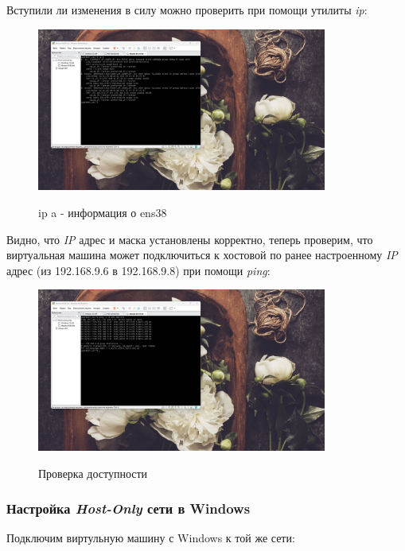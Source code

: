 \documentclass[a4paper]{article}
\begin{document}
  Вступили ли изменения в силу можно проверить при помощи утилиты \textit{ip}:

  \begin{figure}[H]
    \centering
    \includegraphics[width=0.85\textwidth]{06_00 (55)}
    \label{img:55}
    \caption{ip a - информация о ens38}
  \end{figure}
  
  Видно, что \textit{IP} адрес и маска установлены корректно, теперь проверим, что виртуальная
  машина может подключиться к хостовой по ранее настроенному \textit{IP} адрес (из 192.168.9.6 в 192.168.9.8)
  при помощи \textit{ping}:
  
  \begin{figure}[H]
    \centering
    \includegraphics[width=0.85\textwidth]{06_00 (60)}
    \label{img:60}
    \caption{Проверка доступности}
  \end{figure}
  
  \subsubsection{Настройка \textit{Host-Only} сети в Windows}

  Подключим виртульную машину с Windows к той же сети:
\end{document}
